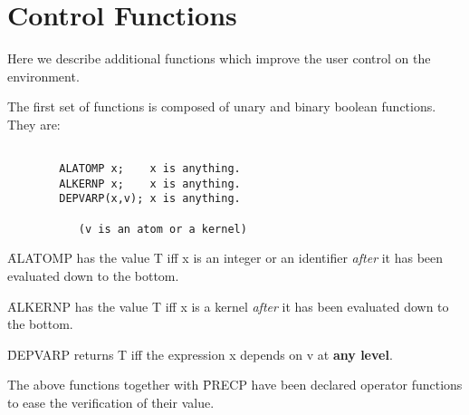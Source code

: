\section{Control Functions}
Here we describe additional functions which
improve the user control on the environment.
\bi
\item[i.]
The first set of functions is composed of unary and binary boolean functions.
They are:
\begin{verbatim}

        ALATOMP x;    x is anything.
        ALKERNP x;    x is anything.
        DEPVARP(x,v); x is anything.

           (v is an atom or a kernel)

\end{verbatim}
\f{ALATOMP} has the value T iff x is an integer or  an identifier
{\em after} it has been evaluated down to the bottom.

\f{ALKERNP} has the value T iff x is a kernel {\em after}
it has been evaluated down to the bottom.

\f{DEPVARP} returns T iff the expression x depends on v at
{\bf any level}.

The above functions together with \f{PRECP} have
 been declared operator functions to ease the verification of
their value.

